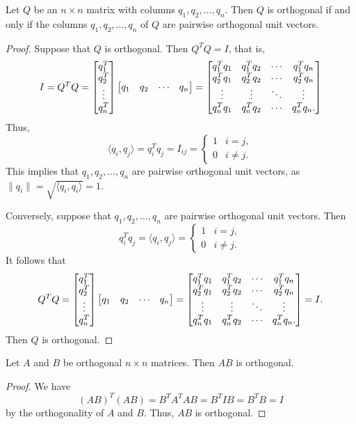 \documentclass{homework}
\begin{document}
	\question
	\begin{alphaparts}
		\questionpart
		Let $Q$ be an $n\times n$ matrix with columns $q_1, q_2, \dots, q_n$. Then $Q$ is orthogonal if and only if the columns $q_1, q_2, \dots, q_n$ of $Q$ are pairwise orthogonal unit vectors.
		\begin{proof}
			Suppose that $Q$ is orthogonal. Then $Q^TQ = I$, that is,
			\begin{equation*}
				I = Q^TQ = \left[\begin{matrix}q_1^T \\ q_2^T \\ \vdots \\ q_n^T\end{matrix}\right]\left[\begin{matrix}q_1 & q_2 & \cdots & q_n\end{matrix}\right] = 
				\left[\begin{matrix}
					q_1^Tq_1 & q_1^Tq_2 & \cdots & q_1^Tq_n \\
					q_2^Tq_1 & q_2^Tq_2 & \cdots & q_2^Tq_n \\
					\vdots & \vdots & \ddots & \vdots \\
					q_n^Tq_1 & q_n^Tq_2 & \cdots & q_n^Tq_n.
				\end{matrix}\right]
			\end{equation*}
			Thus, 
			\begin{equation*}
				\langle q_i, q_j\rangle =q_i^Tq_j = I_{ij} =\begin{cases}
					1 & i = j, \\
					0 & i \ne j.
				\end{cases}
			\end{equation*}
			This implies that $q_1,q_2, \dots, q_n$ are pairwise orthogonal unit vectors, as $\lVert q_i \rVert = \sqrt{\langle q_i, q_i\rangle} = 1$.
			
			Conversely, suppose that $q_1, q_2, \dots, q_n$ are pairwise orthogonal unit vectors. Then
			\begin{equation*}
				q_i^Tq_j = \langle q_i, q_j\rangle =\begin{cases}
					1 & i = j, \\
					0 & i \ne j.
				\end{cases}
			\end{equation*}
			It follows that
			\begin{equation*}
				Q^TQ = \left[\begin{matrix}q_1^T \\ q_2^T \\ \vdots \\ q_n^T\end{matrix}\right]\left[\begin{matrix}q_1 & q_2 & \cdots & q_n\end{matrix}\right] = \left[\begin{matrix}
					q_1^Tq_1 & q_1^Tq_2 & \cdots & q_1^Tq_n \\
					q_2^Tq_1 & q_2^Tq_2 & \cdots & q_2^Tq_n \\
					\vdots & \vdots & \ddots & \vdots \\
					q_n^Tq_1 & q_n^Tq_2 & \cdots & q_n^Tq_n.
				\end{matrix}\right] = I.
			\end{equation*}
			Then $Q$ is orthogonal.
		\end{proof}
		
		\questionpart Let $A$ and $B$ be orthogonal $n\times n$ matrices. Then $AB$ is orthogonal.
		\begin{proof}
			We have
			\begin{equation*}
				(AB)^T(AB) = B^TA^TAB = B^TIB = B^TB = I
			\end{equation*}
			by the orthogonality of $A$ and $B$. Thus, $AB$ is orthogonal.
		\end{proof}
	\end{alphaparts}
	
\end{document}
